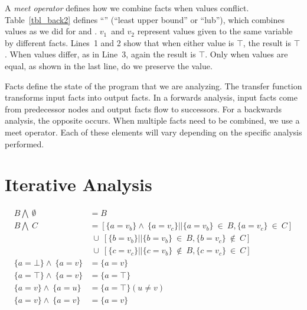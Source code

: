 \documentclass[12pt]{report}
\begin{document}
A \emph{meet operator} defines how we combine facts when values
conflict. Table~\ref{tbl_back2} defines ``\lub'' (``least upper
bound'' or ``lub''), which combines values as we did for
 and . $v_1$~and $v_2$
represent values given to the same variable by different
facts. Lines~1 and 2 show that when either value is $\top$, the result
is $\top$. When values differ, as in Line~3, again the result is
$\top$. Only when values are equal, as shown in the last line, do we
preserve the value.

Facts define the state of the program that we are analyzing. The
transfer function transforms input facts into output facts. In a
forwards analysis, input facts come from predecessor nodes and output
facts flow to successors. For a backwards analysis, the opposite
occurs. When multiple facts need to be combined, we use a meet
operator. Each of these elements will vary depending on the specific
analysis performed.

\section{Iterative Analysis}
\label{sec_back6}

\begin{equation}
  \begin{split}
    B \bigwedge\ \emptyset\ &= B \\
    B \bigwedge\ C &= [\{a=v_b\} \wedge\ \{a=v_c\} || \{a=v_b\}\ \in\ B, \{a=v_c\}\ \in\ C] \\%
                   &\; \cup\ [\{b=v_b\} || \{b=v_b\}\ \in\ B, \{b=v_c\}\ \not\in\ C] \\%
                   &\; \cup\ [\{c=v_c\} || \{c=v_b\}\ \not\in\ B, \{c=v_c\}\ \in\ C] \\
    \{a=\bot\} \wedge\ \{a=v\} &= \{a=v\} \\
    \{a=\top\} \wedge\ \{a=v\} &= \{a=\top\} \\
    \{a=v\} \wedge\ \{a=u\} &= \{a=\top\} (u \neq v) \\
    \{a=v\} \wedge\ \{a=v\} &= \{a=v\} \\
  \end{split}
\end{equation}
\end{document}
